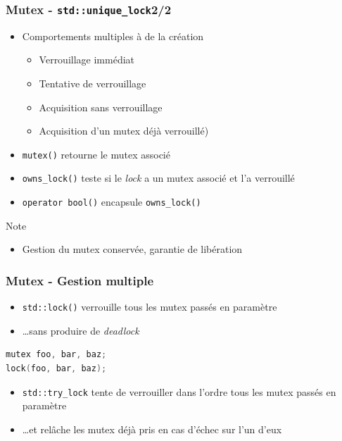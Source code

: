 \documentclass[C++.tex]{subfiles}
\begin{document}
\begin{frame}[fragile]
	\frametitle{Mutex - \lstinline|std::unique_lock|\titlehfill{}2/2}
	\begin{itemize}
		\item Comportements multiples à de la création
		\begin{itemize}
			\item Verrouillage immédiat
			\item Tentative de verrouillage
			\item Acquisition sans verrouillage
			\item Acquisition d'un mutex déjà verrouillé)
		\end{itemize}
		\item \lstinline|mutex()| retourne le mutex associé
		\item \lstinline|owns_lock()| teste si le \textit{lock} a un mutex associé et l'a verrouillé
		\item \lstinline|operator bool()| encapsule \lstinline|owns_lock()|
	\end{itemize}

	\begin{block}{Note}
		\begin{itemize}
			\item Gestion du mutex conservée, garantie de libération
		\end{itemize}
	\end{block}
\end{frame}

\begin{frame}[fragile]
	\frametitle{Mutex - Gestion multiple}
	\begin{itemize}
		\item \lstinline|std::lock()| verrouille tous les mutex passés en paramètre
		\item \ldots{}sans produire de \textit{deadlock}
	\end{itemize}

	\begin{lstlisting}[language=C++]
mutex foo, bar, baz;
lock(foo, bar, baz);\end{lstlisting}

	\begin{itemize}
		\item \lstinline|std::try_lock| tente de verrouiller dans l'ordre tous les mutex passés en paramètre
		\item \ldots{}et relâche les mutex déjà pris en cas d'échec sur l'un d'eux
	\end{itemize}
\end{frame}
\end{document}

